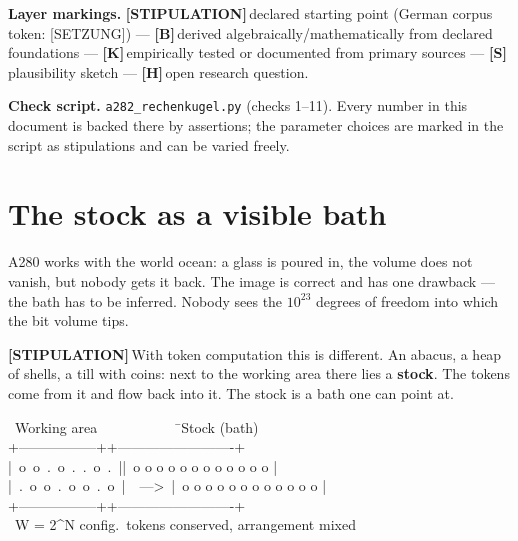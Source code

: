 \documentclass[11pt,a4paper]{article}
\newcommand{\LS}{\textcolor{laySet}{\textbf{\footnotesize\textsf{[STIPULATION]}}}\,}
\newcommand{\LK}{\textcolor{layK}{\textbf{\footnotesize\textsf{[K]}}}\,}
\newcommand{\LB}{\textcolor{layB}{\textbf{\footnotesize\textsf{[B]}}}\,}
\newcommand{\LSk}{\textcolor{layS}{\textbf{\footnotesize\textsf{[S]}}}\,}
\newcommand{\LH}{\textcolor{layH}{\textbf{\footnotesize\textsf{[H]}}}\,}
\begin{document}
\bigskip

\begingroup\small\noindent
\textbf{Layer markings.} \LS declared starting point (German corpus token:
[SETZUNG]) --- \LB derived algebraically/mathematically from declared foundations
--- \LK empirically tested or documented from primary sources --- \LSk
plausibility sketch --- \LH open research question.
\par\endgroup

\bigskip

\begingroup\small\noindent
\textbf{Check script.} \texttt{a282\_rechenkugel.py} (checks 1--11). Every number
in this document is backed there by assertions; the parameter choices are marked
in the script as stipulations and can be varied freely.
\par\endgroup

\bigskip

\section{The stock as a visible bath}

A280 works with the world ocean: a glass is poured in, the volume does not vanish,
but nobody gets it back. The image is correct and has one drawback --- the bath
has to be inferred. Nobody sees the $10^{23}$ degrees of freedom into which the
bit volume tips.

\LS With token computation this is different. An abacus, a heap of shells, a till
with coins: next to the working area there lies a \textbf{stock}. The tokens come
from it and flow back into it. The stock is a bath one can point at.

\begin{center}
\begin{minipage}{0.80\textwidth}
\ttfamily\small
\begin{tabbing}
\ Working area\ \ \ \ \ \ \ \ \ \ \ \=\ Stock (bath)\\[0.3em]
+-----------------+\>+-------------------------+\\
|\ o\ o\ .\ o\ .\ .\ o\ .\ |\>|\ o o o o o o o o o o o o |\\
|\ .\ o\ o\ .\ o\ o\ .\ o\ |\ \ ---\textgreater\ \>|\ o o o o o o o o o o o o |\\
+-----------------+\>+-------------------------+\\
\ W = 2\^{}N config.\>\ tokens conserved, arrangement mixed
\end{tabbing}
\end{minipage}
\end{center}
\end{document}
